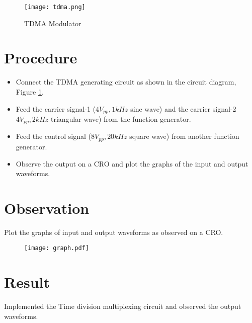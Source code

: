 \begin{figure}[h]
	\texttt{[image: tdma.png]}
	\caption{TDMA Modulator}
	\label{tdma}
\end{figure}

\clearpage
\section*{Procedure}
\begin{itemize}
\item
Connect the TDMA generating circuit as shown in the circuit diagram, Figure \ref{tdma}.
\item
Feed the carrier signal-1 ($4 V_{pp}, 1 kHz$ sine wave) and the carrier signal-2 $4 V_{pp}, 2 kHz$ triangular wave) from the function generator.
\item
Feed the control signal  ($8 V_{pp}, 20 kHz$ square wave) from another function generator.
\item
Observe the output on a CRO and plot the graphs of the input and output waveforms.

\end{itemize}
\section*{Observation}
Plot the graphs of input and output waveforms as observed on a CRO.

\begin{figure}
	\texttt{[image: graph.pdf]}
\end{figure}

\section*{Result}

Implemented the Time division multiplexing circuit and observed the output waveforms.
